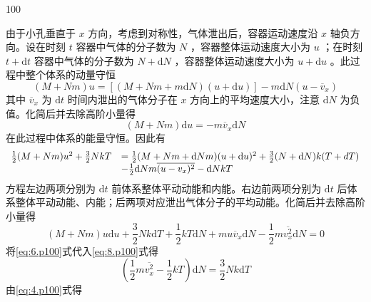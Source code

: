 \begin{solution}{100}
    \begin{subsolution}
        由于小孔垂直于 $x$ 方向，考虑到对称性，气体泄出后，容器运动速度沿 $x$ 轴负方向。设在时刻 $t$ 容器中气体的分子数为 $N$ ，容器整体运动速度大小为 $u$ ；在时刻 $t + \mathrm{d}t$ 容器中气体的分子数为 $N + \mathrm{d}N$ ，容器整体运动速度大小为 $u + \mathrm{d}u$ 。此过程中整个体系的动量守恒
        \begin{equation}
            (M + N m) u = \left[ (M + N m + m \mathrm{d} N) (u + \mathrm{d} u) \right] - m \mathrm{d} N (u - \overline {{{v}}} _ {x})
            \label{eq:5.p100}
        \end{equation}
        其中 $\overline{v}_{x}$ 为 $\mathrm{d}t$ 时间内泄出的气体分子在 $x$ 方向上的平均速度大小，注意 $\mathrm{d}N$ 为负值。化简后并去除高阶小量得
        \begin{equation}
            (M + N m) \mathrm{d} u = - m \overline {{v}} _ {x} \mathrm{d} N
            \label{eq:6.p100}
        \end{equation}
        在此过程中体系的能量守恒。因此有
        \begin{equation}
            \begin{array}{r l} \frac {1}{2} (M + N m) u ^ {2} + \frac {3}{2} N k T & = \frac {1}{2} (M + N m + \mathrm{d} N m) (u + \mathrm{d} u) ^ {2} + \frac {3}{2} (N + \mathrm{d} N) k (T + d T) \\ & - \frac {1}{2} \mathrm{d} N m \overline {{(u - v _ {x}) ^ {2}}} - \mathrm{d} N k T \end{array}
            \label{eq:7.p100}
        \end{equation}
        方程左边两项分别为 $\mathrm{d}t$ 前体系整体平动动能和内能。右边前两项分别为 $\mathrm{d}t$ 后体系整体平动动能、内能；后两项对应泄出气体分子的平均动能。化简后并去除高阶小量得
        \begin{equation}
            (M + N m) u \mathrm{d} u + \frac {3}{2} N k \mathrm{d} T + \frac {1}{2} k T \mathrm{d} N + m u \overline {{v}} _ {x} \mathrm{d} N - \frac {1}{2} m \overline {{v _ {x} ^ {2}}} \mathrm{d} N = 0
            \label{eq:8.p100}
        \end{equation}
        将\eqref{eq:6.p100}式代入\eqref{eq:8.p100}式得
        \begin{equation}
            \left(\frac {1}{2} m \overline {{v _ {x} ^ {2}}} - \frac {1}{2} k T\right) \mathrm{d} N = \frac {3}{2} N k \mathrm{d} T
            \label{eq:9.p100}
        \end{equation}
        由\eqref{eq:4.p100}式得
        \begin{equation*}

\end{equation*}
\end{subsolution}
\end{solution}
